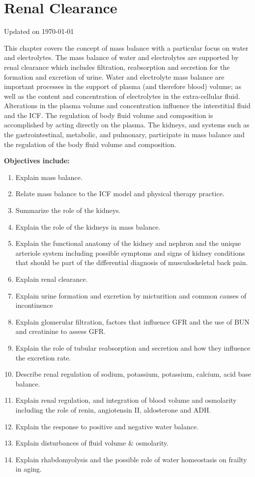 \chapter{Renal Clearance}\label{chp:renal_clearance}
Updated on \today
\minitoc

This chapter covers the concept of mass balance with a particular focus on water and electrolytes. The mass balance of water and electrolytes are supported by renal clearance which includes filtration, reabsorption and secretion for the formation and excretion of urine. Water and electrolyte mass balance are important processes in the support of plasma (and therefore blood) volume; as well as the content and concentration of electrolytes in the extra-cellular fluid. Alterations in the plasma volume and concentration influence the interstitial fluid and the ICF. The regulation of body fluid volume and composition is accomplished by acting directly on the plasma. The kidneys, and systems such as the gastrointestinal, metabolic, and pulmonary, participate in mass balance and the regulation of the body fluid volume and composition.

\vspace{2mm}
\begin{svgraybox}
\textbf{Objectives include:}
\begin{enumerate}
    \item Explain mass balance.
    \item Relate mass balance to the ICF model and physical therapy practice. 
    \item Summarize the role of the kidneys.
    \item Explain the role of the kidneys in mass balance.
    \item Explain the functional anatomy of the kidney and nephron and the unique arteriole system including possible symptoms and signs of kidney conditions that should be part of the differential diagnosis of musculoskeletal back pain.
    \item Explain renal clearance.
    \item Explain urine formation and excretion by micturition and common causes of incontinence
    \item Explain glomerular filtration, factors that influence GFR and the use of BUN and creatinine to assess GFR.
    \item Explain the role of tubular reabsorption and secretion and how they influence the excretion rate.
    \item Describe renal regulation of sodium, potassium, potassium, calcium, acid base balance.
    \item Explain renal regulation, and integration of blood volume and osmolarity including the role of renin, angiotensin II, aldosterone and ADH.
    \item Explain the response to positive and negative water balance.
    \item Explain disturbances of fluid volume \& osmolarity.
    \item Explain rhabdomyolysis and the possible role of water homeostasis on frailty in aging.
\end{enumerate}
\end{svgraybox}

